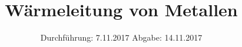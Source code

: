 

\subject{v204}
\title{Wärmeleitung von Metallen}
\date{%
 Durchführung: 7.11.2017
  \hspace{3em}
  Abgabe: 14.11.2017
}



\maketitle
\thispagestyle{empty}
\tableofcontents
\newpage






\nocite{*}
\printbibliography{}


